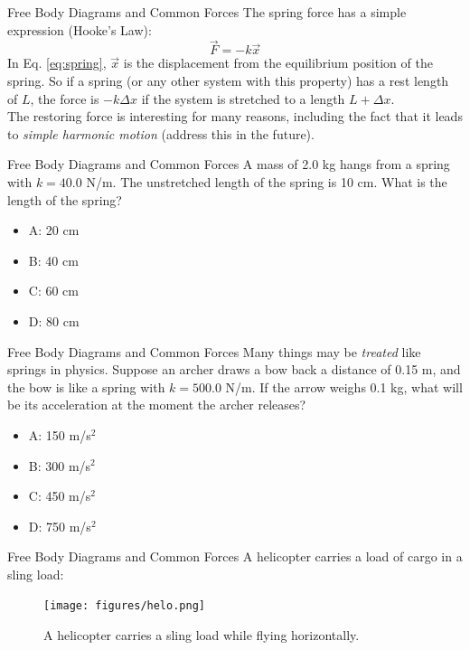 \documentclass{beamer}
\begin{document}
\begin{frame}{Free Body Diagrams and Common Forces}
The spring force has a simple expression (Hooke's Law):
\begin{equation}
\vec{F} = -k\vec{x}
\label{eq:spring}
\end{equation}
In Eq. \ref{eq:spring}, $\vec{x}$ is the displacement from the equilibrium position of the spring.  So if a spring (or any other system with this property) has a rest length of $L$, the force is $-k\Delta x$ if the system is stretched to a length $L+\Delta x$. \\
\vspace{0.5cm}
The restoring force is interesting for many reasons, including the fact that it leads to \textit{simple harmonic motion} (address this in the future).
\end{frame}

\begin{frame}{Free Body Diagrams and Common Forces}
A mass of 2.0 kg hangs from a spring with $k = 40.0$ N/m.  The unstretched length of the spring is 10 cm.  What is the length of the spring?
\begin{itemize}
\item A: 20 cm
\item B: 40 cm
\item C: 60 cm
\item D: 80 cm
\end{itemize}
\end{frame}

\begin{frame}{Free Body Diagrams and Common Forces}
Many things may be \textit{treated} like springs in physics.  Suppose an archer draws a bow back a distance of 0.15 m, and the bow is like a spring with $k = 500.0$ N/m.  If the arrow weighs 0.1 kg, what will be its acceleration at the moment the archer releases?
\begin{itemize}
\item A: 150 m/s$^2$
\item B: 300 m/s$^2$
\item C: 450 m/s$^2$
\item D: 750 m/s$^2$
\end{itemize}
\end{frame}

\begin{frame}{Free Body Diagrams and Common Forces}
A helicopter carries a load of cargo in a sling load: \\
\begin{figure}
\centering
\texttt{[image: figures/helo.png]}
\caption{\label{fig:helo} A helicopter carries a sling load while flying horizontally.}
\end{figure}
\end{frame}
\end{document}
